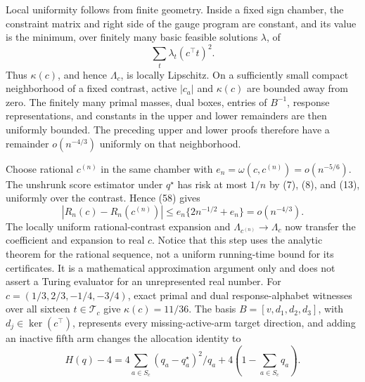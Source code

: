 Local uniformity follows from finite geometry.  Inside a fixed sign chamber, the constraint matrix and right side of the gauge program are constant, and its value is the minimum, over finitely many basic feasible solutions \(\lambda\), of
\[
\sum_t\lambda_t(c^\top t)^2.
\]
Thus \(\kappa(c)\), and hence \(\Lambda_c\), is locally Lipschitz.  On a sufficiently small compact neighborhood of a fixed contrast, active \(|c_a|\) and \(\kappa(c)\) are bounded away from zero.  The finitely many primal masses, dual boxes, entries of \(B^{-1}\), response representations, and constants in the upper and lower remainders are then uniformly bounded.  The preceding upper and lower proofs therefore have a remainder \(o(n^{-4/3})\) uniformly on that neighborhood.

Choose rational \(c^{(n)}\) in the same chamber with \(e_n=\omega(c,c^{(n)})=o(n^{-5/6})\).  The unshrunk score estimator under \(q^\star\) has risk at most \(1/n\) by (7), (8), and (13), uniformly over the contrast.  Hence (58) gives
\[
|R_n(c)-R_n(c^{(n)})|
\le e_n\{2n^{-1/2}+e_n\}
=o(n^{-4/3}).
\tag{59}
\]
The locally uniform rational-contrast expansion and \(\Lambda_{c^{(n)}}\to\Lambda_c\) now transfer the coefficient and expansion to real \(c\).  Notice that this step uses the analytic theorem for the rational sequence, not a uniform running-time bound for its certificates.  It is a mathematical approximation argument only and does not assert a Turing evaluator for an unrepresented real number.
For \(c=(1/3,2/3,-1/4,-3/4)\), exact primal and dual response-alphabet witnesses over all sixteen \(t\in\mathcal T_c\) give \(\kappa(c)=11/36\). The basis \(B=[v,d_1,d_2,d_3]\), with \(d_j\in\ker(c^\top)\), represents every missing-active-arm target direction, and adding an inactive fifth arm changes the allocation identity to
\[
H(q)-4=4\sum_{a\in S_c}(q_a-q_a^\star)^2/q_a+4\left(1-\sum_{a\in S_c}q_a\right).
\]
